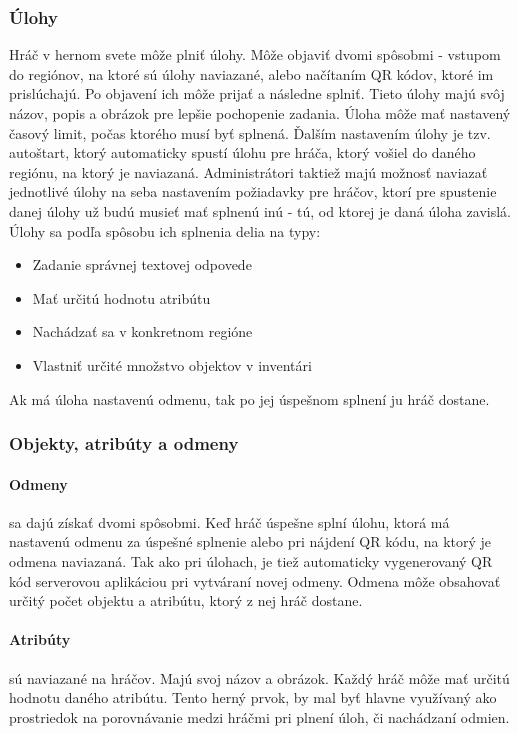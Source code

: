\subsubsection{Úlohy}
Hráč v hernom svete môže plniť úlohy. Môže objaviť dvomi spôsobmi - vstupom do regiónov, na ktoré sú úlohy naviazané, alebo načítaním QR kódov, ktoré im prislúchajú. Po objavení ich môže prijať a následne splniť. Tieto úlohy majú svôj názov, popis a obrázok pre lepšie pochopenie zadania. Úloha môže mať nastavený časový limit, počas ktorého musí byť splnená. Ďalším nastavením úlohy je tzv. autoštart, ktorý automaticky spustí úlohu pre hráča, ktorý vošiel do daného regiónu, na ktorý je naviazaná. Administrátori taktiež majú možnosť naviazať jednotlivé úlohy na seba nastavením požiadavky pre hráčov, ktorí pre spustenie danej úlohy už budú musieť mať splnenú inú - tú, od ktorej je daná úloha zavislá. Úlohy sa podľa spôsobu ich splnenia delia na typy:
\begin{itemize}
	\item Zadanie správnej textovej odpovede
	\item Mať určitú hodnotu atribútu
	\item Nachádzať sa v konkretnom regióne
	\item Vlastniť určité množstvo objektov v inventári
\end{itemize}
Ak má úloha nastavenú odmenu, tak po jej úspešnom splnení ju hráč dostane.


\subsubsection{Objekty, atribúty a odmeny}
\paragraph{Odmeny} sa dajú získať dvomi spôsobmi. Keď hráč úspešne splní úlohu, ktorá má nastavenú odmenu za úspešné splnenie alebo pri nájdení QR kódu, na ktorý je odmena naviazaná. Tak ako pri úlohach, je tiež automaticky vygenerovaný QR kód serverovou aplikáciou pri vytváraní novej odmeny. Odmena môže obsahovať určitý počet objektu a atribútu, ktorý z nej hráč dostane.

\paragraph{Atribúty} sú naviazané na hráčov. Majú svoj názov a obrázok. Každý hráč môže mať určitú hodnotu daného atribútu. Tento herný prvok, by mal byť hlavne využívaný ako prostriedok na porovnávanie medzi hráčmi pri plnení úloh, či nachádzaní odmien. 

